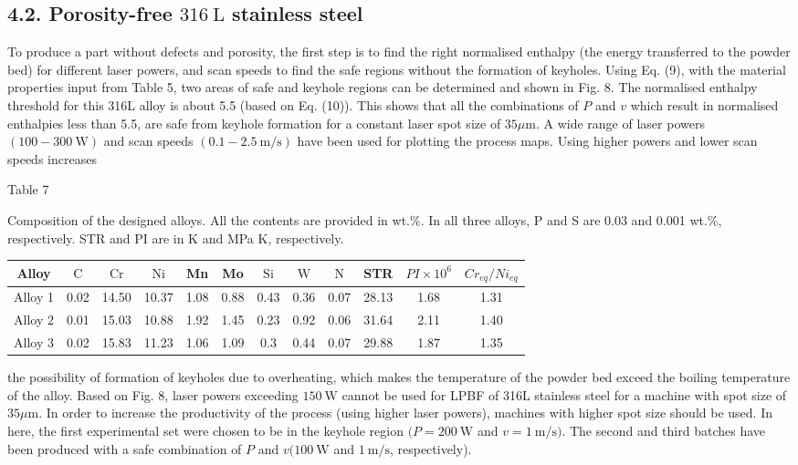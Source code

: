 \documentclass[10pt]{article}
\begin{document}
\subsection*{4.2. Porosity-free $316 \mathrm{~L}$ stainless steel}
To produce a part without defects and porosity, the first step is to find the right normalised enthalpy (the energy transferred to the powder bed) for different laser powers, and scan speeds to find the safe regions without the formation of keyholes. Using Eq. (9), with the material properties input from Table 5, two areas of safe and keyhole regions can be determined and shown in Fig. 8. The normalised enthalpy threshold for this 316L alloy is about 5.5 (based on Eq. (10)). This shows that all the combinations of $P$ and $v$ which result in normalised enthalpies less than 5.5, are safe from keyhole formation for a constant laser spot size of $35 \mu \mathrm{m}$. A wide range of laser powers $(100-300 \mathrm{~W})$ and scan speeds $(0.1-2.5 \mathrm{~m} / \mathrm{s})$ have been used for plotting the process maps. Using higher powers and lower scan speeds increases

Table 7

Composition of the designed alloys. All the contents are provided in wt.\%. In all three alloys, P and S are 0.03 and 0.001 wt.\%, respectively. STR and PI are in K and MPa K, respectively.

\begin{center}
\begin{tabular}{|c|c|c|c|c|c|c|c|c|c|c|c|}
\hline
Alloy & $\mathrm{C}$ & $\mathrm{Cr}$ & $\mathrm{Ni}$ & Mn & Mo & $\mathrm{Si}$ & $\mathrm{W}$ & $\mathrm{N}$ & STR & $P I \times 10^{6}$ & $C r_{e q} / N i_{e q}$ \\
\hline
Alloy 1 & 0.02 & 14.50 & 10.37 & 1.08 & 0.88 & 0.43 & 0.36 & 0.07 & 28.13 & 1.68 & 1.31 \\
\hline
Alloy 2 & 0.01 & 15.03 & 10.88 & 1.92 & 1.45 & 0.23 & 0.92 & 0.06 & 31.64 & 2.11 & 1.40 \\
\hline
Alloy 3 & 0.02 & 15.83 & 11.23 & 1.06 & 1.09 & 0.3 & 0.44 & 0.07 & 29.88 & 1.87 & 1.35 \\
\hline
\end{tabular}
\end{center}

the possibility of formation of keyholes due to overheating, which makes the temperature of the powder bed exceed the boiling temperature of the alloy. Based on Fig. 8, laser powers exceeding $150 \mathrm{~W}$ cannot be used for LPBF of 316L stainless steel for a machine with spot size of $35 \mu \mathrm{m}$. In order to increase the productivity of the process (using higher laser powers), machines with higher spot size should be used. In here, the first experimental set were chosen to be in the keyhole region $(P=200 \mathrm{~W}$ and $v=1 \mathrm{~m} / \mathrm{s})$. The second and third batches have been produced with a safe combination of $P$ and $v(100 \mathrm{~W}$ and $1 \mathrm{~m} / \mathrm{s}$, respectively).
\end{document}
